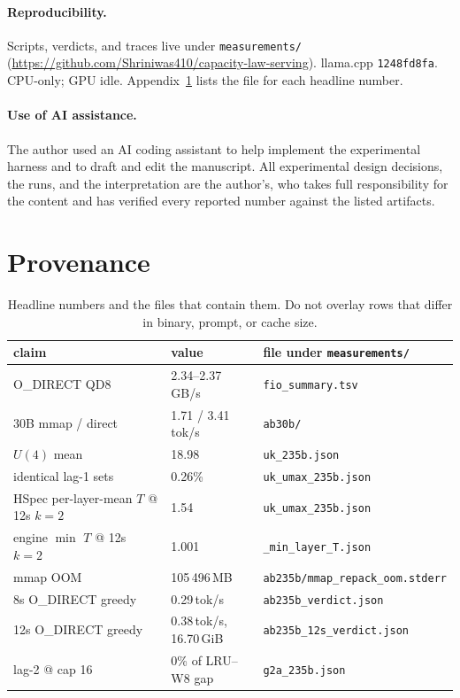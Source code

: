 \documentclass[11pt]{article}
\newcommand{\tps}{tok/s}
\begin{document}
\paragraph{Reproducibility.}
Scripts, verdicts, and traces live under \texttt{measurements/}
(\url{https://github.com/Shriniwas410/capacity-law-serving}). llama.cpp
\texttt{1248fd8fa}. CPU-only; GPU idle.
Appendix~\ref{app:prov} lists the file for each headline number.

\paragraph{Use of AI assistance.}
The author used an AI coding assistant to help implement the experimental
harness and to draft and edit the manuscript. All experimental design
decisions, the runs, and the interpretation are the author's, who takes full
responsibility for the content and has verified every reported number against
the listed artifacts.



\appendix
\section{Provenance}
\label{app:prov}

\begin{table}[h]\centering
\caption{Headline numbers and the files that contain them. Do not overlay rows
that differ in binary, prompt, or cache size.}
\label{tab:prov}
\small
\begin{tabular}{llp{5.2cm}}
\toprule
claim & value & file under \texttt{measurements/} \\
\midrule
O\_DIRECT QD8 & 2.34--2.37\,GB/s & \texttt{fio\_summary.tsv} \\
30B mmap / direct & 1.71 / 3.41\,\tps{} & \texttt{ab30b/} \\
$U(4)$ mean & 18.98 & \texttt{uk\_235b.json} \\
identical lag-1 sets & 0.26\% & \texttt{uk\_umax\_235b.json} \\
HSpec per-layer-mean $T$ @ 12s $k{=}2$ & 1.54 & \texttt{uk\_umax\_235b.json} \\
engine $\min$ $T$ @ 12s $k{=}2$ & 1.001 & \texttt{\_min\_layer\_T.json} \\
mmap OOM & 105\,496\,MB & \texttt{ab235b/mmap\_repack\_oom.stderr} \\
8s O\_DIRECT greedy & 0.29\,\tps{} & \texttt{ab235b\_verdict.json} \\
12s O\_DIRECT greedy & 0.38\,\tps{}, 16.70\,GiB & \texttt{ab235b\_12s\_verdict.json} \\
lag-2 @ cap 16 & 0\% of LRU--W8 gap & \texttt{g2a\_235b.json} \\
\bottomrule
\end{tabular}
\end{table}
\end{document}
